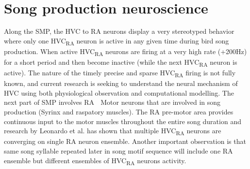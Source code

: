 \documentclass[draft,12pt,oneside]{CUNY_PhD}
\begin{document}
\section{Song production neuroscience}
Along the SMP, the HVC to RA neurons display a very stereotyped behavior where only one HVC\textsubscript{RA} neuron is active in any given time during bird song production. When active HVC\textsubscript{RA} neurons are firing at a very high rate (+200Hz) for a short period and then become inactive (while the next HVC\textsubscript{RA} neuron is active). The nature of the timely precise and sparse HVC\textsubscript{RA} firing is not fully known, and current research is seeking to understand the neural mechanism of HVC using both physiological observation and computational modelling. 
The next part of SMP involves RA  Motor neurons that are involved in song production (Syrinx and raspatory muscles). The RA pre-motor area provides continuous input to the motor muscles throughout the entire song duration and research by Leonardo et al. \cite{4} has shown that multiple HVC\textsubscript{RA} neurons are converging on single RA neuron ensemble. Another important observation is that same song syllable repeated later in song motif sequence will include one RA ensemble but different ensembles of HVC\textsubscript{RA} neurons activity.
\end{document}
